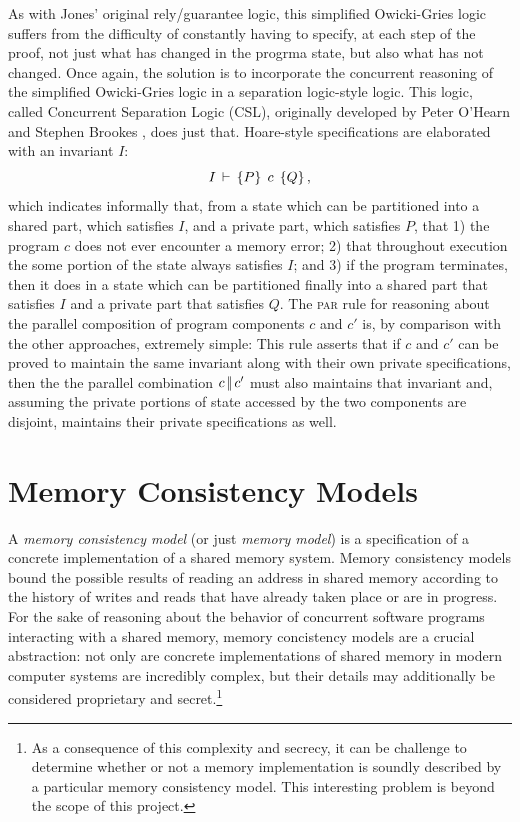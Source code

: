 \documentclass[11pt]{report}
\begin{document}
As with Jones' original rely/guarantee logic, this simplified Owicki-Gries logic suffers from the difficulty of constantly having to specify, at each step of the proof, not just what has changed in the progrma state, but also what has not changed. Once again, the solution is to incorporate the concurrent reasoning of the simplified Owicki-Gries logic in a separation logic-style logic. This logic, called Concurrent Separation Logic (CSL), originally developed by Peter O'Hearn and Stephen Brookes \cite{DBLP:journals/tcs/OHearn07,DBLP:journals/tcs/Brookes07}, does just that. Hoare-style specifications are elaborated with an invariant $I$: \[ I\,\vdash\,\left\lbrace P \right\rbrace\;c\;\left\lbrace Q \right\rbrace,\] which indicates informally that, from a state which can be partitioned into a shared part, which satisfies $I$, and a private part, which satisfies $P$, that 1) the program $c$ does not ever encounter a memory error; 2) that throughout execution the some portion of the state always satisfies $I$; and 3) if the program terminates, then it does in a state which can be partitioned finally into a shared part that satisfies $I$ and a private part that satisfies $Q$. The \textsc{par} rule for reasoning about the parallel composition of program components $c$ and $c'$ is, by comparison with the other approaches, extremely simple:  This rule asserts that if $c$ and $c'$ can be proved to maintain the same invariant along with their own private specifications, then the the parallel combination $c \operatorname{|\!|} c'$ must also maintains that invariant and, assuming the private portions of state accessed by the two components are disjoint, maintains their private specifications as well. 

\section{Memory Consistency Models}
\label{sec:memory-models}

A \emph{memory consistency model} (or just \emph{memory model}) is a specification of a concrete implementation of a shared memory system. Memory consistency models bound the possible results of reading an address in shared memory according to the history of writes and reads that have already taken place or are in progress. For the sake of reasoning about the behavior of concurrent software programs interacting with a shared memory, memory concistency models are a crucial abstraction: not only are concrete implementations of shared memory in modern computer systems are incredibly complex, but their details may additionally be considered proprietary and secret.\footnote{As a consequence of this complexity and secrecy, it can be challenge to determine whether or not a memory implementation is soundly described by a particular memory consistency model. This interesting problem is beyond the scope of this project.}  
\end{document}
